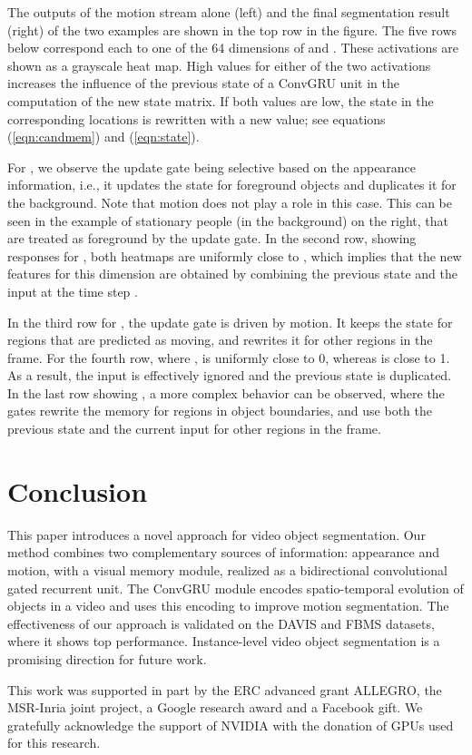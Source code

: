\documentclass[10pt,twocolumn,letterpaper]{article}
\begin{document}
The outputs of the motion stream alone (left) and the final segmentation result
(right) of the two examples are shown in the top row in the figure. The five
rows below correspond each to one of the 64 dimensions of  and . These activations are shown as a grayscale heat map. High
values for either of the two activations increases the influence of the previous
state of a ConvGRU unit in the computation of the new state matrix. If
both values are low, the state in the corresponding locations is
rewritten with a new value; see equations (\ref{eqn:candmem}) and 
(\ref{eqn:state}).

For , we observe the update gate being selective based on the appearance
information, i.e., it updates the state for foreground objects and duplicates
it for the background. Note that motion does not play a role in this case. This
can be seen in the example of stationary people (in the background) on the right, that are treated as foreground by the update gate. In the
second row, showing responses for , both heatmaps are uniformly close to
, which implies that the new features for this dimension are obtained by
combining the previous state and the input at the time step .

In the third row for , the update gate is driven by motion. It keeps the
state for regions that are predicted as moving, and rewrites it for other
regions in the frame. For the fourth row, where ,  is uniformly
close to 0, whereas  is close to 1. As a result, the input is
effectively ignored and the previous state is duplicated. In the last row
showing , a more complex behavior can be observed, where the gates
rewrite the memory for regions in object boundaries, and use both the previous
state and the current input for other regions in the frame.

\section{Conclusion}
This paper introduces a novel approach for video object segmentation. Our
method combines two complementary sources of information: appearance and
motion, with a visual memory module, realized as a bidirectional convolutional
gated recurrent unit. The ConvGRU module encodes spatio-temporal evolution of
objects in a video and uses this encoding to improve motion segmentation. The
effectiveness of our approach is validated on the DAVIS and FBMS datasets,
where it shows top performance. Instance-level video object segmentation is a
promising direction for future work.

\vspace{0.2cm}
This work was supported in part by the ERC advanced grant ALLEGRO, the
MSR-Inria joint project, a Google research award and a Facebook gift. We
gratefully acknowledge the support of NVIDIA with the donation of GPUs used for
this research.

{\small


}
\end{document}
